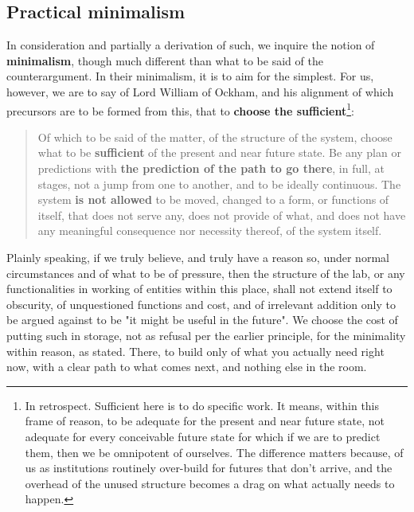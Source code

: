 \documentclass[10pt,a4paper]{article}
\begin{document}
\subsection{Practical minimalism}

In consideration and partially a derivation of such, we inquire the notion of \textbf{minimalism}, though much different than what to be said of the counterargument. In their minimalism, it is to aim for the simplest. For us, however, we are to say of Lord William of Ockham, and his alignment of which precursors are to be formed from this, that to \textbf{choose the sufficient}\footnote{In retrospect. Sufficient here is to do specific work. It means, within this frame of reason, to be adequate for the present and near future state, not adequate for every conceivable future state for which if we are to predict them, then we be omnipotent of ourselves. The difference matters because, of us as institutions routinely over-build for futures that don't arrive, and the overhead of the unused structure becomes a drag on what actually needs to happen.}:

\begin{quote}
    Of which to be said of the matter, of the structure of the system, choose what to be \textbf{sufficient} of the present and near future state. Be any plan or predictions with \textbf{the prediction of the path to go there}, in full, at stages, not a jump from one to another, and to be ideally continuous. The system \textbf{is not allowed} to be moved, changed to a form, or functions of itself, that does not serve any, does not provide of what, and does not have any meaningful consequence nor necessity thereof, of the system itself.
\end{quote}

Plainly speaking, if we truly believe, and truly have a reason so, under normal circumstances and of what to be of pressure, then the structure of the lab, or any functionalities in working of entities within this place, shall not extend itself to obscurity, of unquestioned functions and cost, and of irrelevant addition only to be argued against to be "it might be useful in the future". We choose the cost of putting such in storage, not as refusal per the earlier principle, for the minimality within reason, as stated. There, to build only of what you actually need right now, with a clear path to what comes next, and nothing else in the room. 

\end{document}
